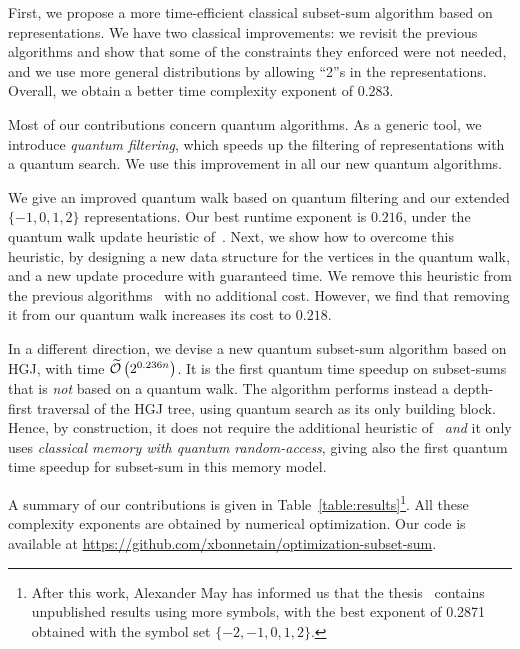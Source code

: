 First, we propose a more time-efficient classical subset-sum algorithm based on representations. We have two classical improvements: we revisit the previous algorithms and show that some of the constraints they enforced were not needed, and we use more general distributions by allowing ``2''s in the representations. Overall, we obtain a better time complexity exponent of $0.283$.


Most of our contributions concern quantum algorithms. As a generic tool, we introduce \emph{quantum filtering}, which speeds up the filtering of representations with a quantum search. We use this improvement in all our new quantum algorithms.

We give an improved quantum walk based on quantum filtering and our extended $\{-1,0,1,2\}$ representations. Our best runtime exponent is $0.216$, under the quantum walk update heuristic of~\cite{DBLP:conf/tqc/HelmM18}. Next, we show how to overcome this heuristic, by designing a new data structure for the vertices in the quantum walk, and a new update procedure with guaranteed time. We remove this heuristic from the previous algorithms~\cite{DBLP:conf/pqcrypto/BernsteinJLM13,DBLP:conf/tqc/HelmM18} with no additional cost. However, we find that removing it from our quantum walk increases its cost to $0.218$.

In a different direction, we devise a new quantum subset-sum algorithm based on HGJ, with time $\widetilde{\mathcal{O}} \left(2^{0.236 n} \right)$. It is the first quantum time speedup on subset-sums that is \emph{not} based on a quantum walk. The algorithm performs instead a depth-first traversal of the HGJ tree, using quantum search as its only building block. Hence, by construction, it does not require the additional heuristic of~\cite{DBLP:conf/tqc/HelmM18} \emph{and} it only uses \emph{classical memory with quantum random-access}, giving also the first quantum time speedup for subset-sum in this memory model.

A summary of our contributions is given in Table~\ref{table:results}\footnote{After this work, Alexander May has informed us that the thesis~\cite{bohme11} contains unpublished results using more symbols, with the best exponent of 0.2871 obtained with the symbol set $\{-2, -1,0,1,2\}$. }. 
All these complexity exponents are obtained by numerical optimization. Our code is available at \url{https://github.com/xbonnetain/optimization-subset-sum}.

